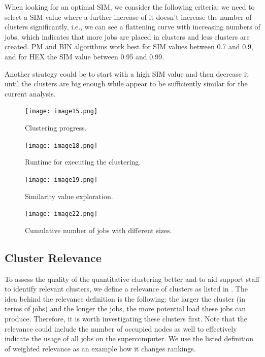 \documentclass{jhps}
\begin{document}
When looking for an optimal SIM, we consider the following criteria:
we need to select a SIM value where a further increase of it doesn't increase the number of clusters significantly, i.e., we can see a flattening curve with increasing numbers of jobs, which indicates that more jobs are placed in clusters and less clusters are created.
PM and BIN algorithms work best for SIM values between 0.7 and 0.9, and for HEX the SIM value between 0.95 and 0.99.

Another strategy could be to start with a high SIM value and then decrease it until the clusters are big enough while appear to be sufficiently similar for the current analysis.

\begin{figure}
  \centering
   \texttt{[image: image15.png]}
   \caption{Clustering progress.}
   \label{fig:clustering_progress}
\end{figure}

\begin{figure}
  \centering
  \texttt{[image: image18.png]}
  \caption{Runtime for executing the clustering.}
  \label{fig:alg_runtimes}
\end{figure}


\begin{figure}
  \centering
  \texttt{[image: image19.png]}
  \caption{Similarity value exploration.}
  \label{fig:sim_exploration}
\end{figure}

\begin{figure}
  \centering
  \texttt{[image: image22.png]}
  \caption{Cumulative number of jobs with different sizes.}
  \label{fig:cum_num_job_sizes}
\end{figure}

\subsection{Cluster Relevance}

To assess the quality of the quantitative clustering better and to aid support staff to identify relevant clusters, we define a relevance of clusters as listed in .
The idea behind the relevance definition is the following: the larger the cluster (in terms of jobs) and the longer the jobs, the more potential load these jobs can produce.
Therefore, it is worth investigating these clusters first.
Note that the relevance could include the number of occupied nodes as well to effectively indicate the usage of all jobs on the supercomputer.
We use the listed definition of weighted relevance as an example how it changes rankings.
\end{document}
